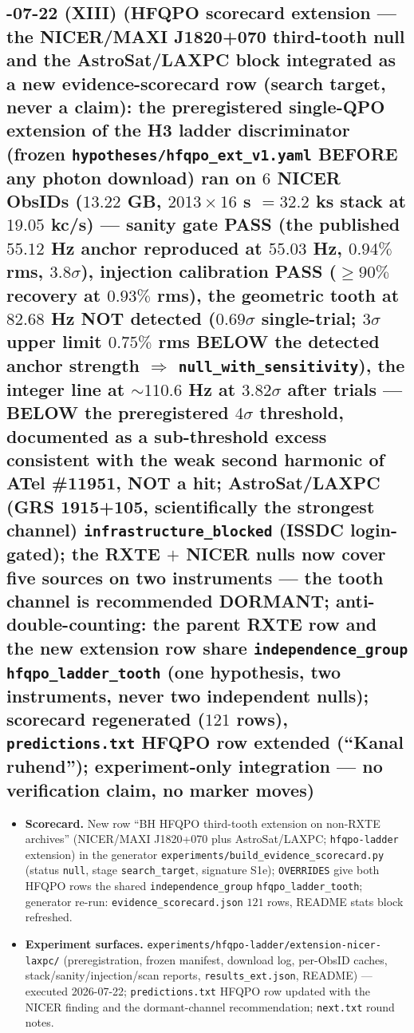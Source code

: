 \subsection*{-07-22 (XIII) (HFQPO scorecard extension --- the NICER/MAXI J1820+070 third-tooth null and the AstroSat/LAXPC block integrated as a new evidence-scorecard row (search target, never a claim): the preregistered single-QPO extension of the H3 ladder discriminator (frozen \texttt{hypotheses/hfqpo\_ext\_v1.yaml} BEFORE any photon download) ran on $6$ NICER ObsIDs ($13.22$ GB, $2013\times16$ s $=32.2$ ks stack at $19.05$ kc/s) --- sanity gate PASS (the published $55.12$ Hz anchor reproduced at $55.03$ Hz, $0.94\%$ rms, $3.8\sigma$), injection calibration PASS ($\ge90\%$ recovery at $0.93\%$ rms), the geometric tooth at $82.68$ Hz NOT detected ($0.69\sigma$ single-trial; $3\sigma$ upper limit $0.75\%$ rms BELOW the detected anchor strength $\Rightarrow$ \texttt{null\_with\_sensitivity}), the integer line at $\sim110.6$ Hz at $3.82\sigma$ after trials --- BELOW the preregistered $4\sigma$ threshold, documented as a sub-threshold excess consistent with the weak second harmonic of ATel \#11951, NOT a hit; AstroSat/LAXPC (GRS 1915+105, scientifically the strongest channel) \texttt{infrastructure\_blocked} (ISSDC login-gated); the RXTE $+$ NICER nulls now cover five sources on two instruments --- the tooth channel is recommended DORMANT; anti-double-counting: the parent RXTE row and the new extension row share \texttt{independence\_group} \texttt{hfqpo\_ladder\_tooth} (one hypothesis, two instruments, never two independent nulls); scorecard regenerated ($121$ rows), \texttt{predictions.txt} HFQPO row extended (``Kanal ruhend''); experiment-only integration --- no verification claim, no marker moves)}
\begin{itemize}[leftmargin=1.5em]
\item \textbf{Scorecard.} New row ``BH HFQPO third-tooth extension on non-RXTE archives''
(NICER/MAXI J1820+070 plus AstroSat/LAXPC; \texttt{hfqpo-ladder} extension) in the generator
\texttt{experiments/build\_evidence\_scorecard.py} (status \texttt{null}, stage
\texttt{search\_target}, signature S1e); \texttt{OVERRIDES} give both HFQPO rows the shared
\texttt{independence\_group} \texttt{hfqpo\_ladder\_tooth}; generator re-run:
\texttt{evidence\_scorecard.json} $121$ rows, README stats block refreshed.
\item \textbf{Experiment surfaces.} \texttt{experiments/hfqpo-ladder/extension-nicer-laxpc/}
(preregistration, frozen manifest, download log, per-ObsID caches, stack/sanity/injection/scan
reports, \texttt{results\_ext.json}, README) --- executed 2026-07-22; \texttt{predictions.txt}
HFQPO row updated with the NICER finding and the dormant-channel recommendation;
\texttt{next.txt} round notes.
\end{itemize}

